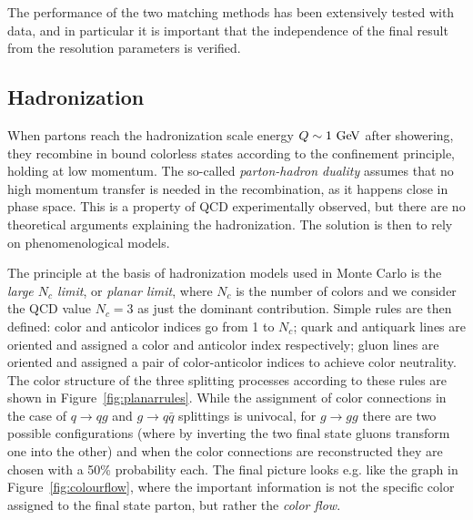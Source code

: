 The performance of the two matching methods has been extensively tested
with data, and in particular it is important that the independence of
the final result from the resolution parameters is verified.


\subsection{Hadronization}\label{sec:hadronization}

When partons reach the hadronization scale energy $Q\sim 1\gev$ after showering,
they recombine in bound colorless states according to the confinement
principle, holding at low momentum. The so-called {\it parton-hadron duality}
assumes that no high momentum transfer is needed in the recombination,
as it happens  close in phase space. This is a property of QCD
experimentally observed, but there are no theoretical arguments
explaining the hadronization. The solution is then to rely on
phenomenological models.

The principle at the basis of hadronization models used in Monte Carlo is the 
{\it large $N_c$ limit}, or {\it planar limit}, where $N_c$ is the number
of colors and we consider the QCD value $N_c = 3$ as just the dominant
contribution. Simple rules are then defined: color and anticolor indices
go from 1 to $N_c$; quark and antiquark lines are oriented and assigned
a color and anticolor index respectively; gluon lines are oriented and assigned
a pair of color-anticolor indices to achieve color neutrality. 
The color structure of the three splitting
processes according to these rules are shown in Figure~\ref{fig:planarrules}.
While the assignment of color connections in the case of $q\to qg$ and
$g\to q\bar{q}$ splittings is univocal, for $g\to gg$ there are two possible
configurations (where by inverting the two final state gluons transform one
into the other) and when the color connections are reconstructed they are chosen
with a 50\% probability each. The final picture looks e.g. like the graph
in Figure~\ref{fig:colourflow}, where the important information is not the
specific color assigned to the final state parton, but rather the {\it color flow}.


